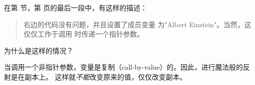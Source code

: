 \begin{Exercise}[title={指针和反射},difficulty=5]
\label{ex:pointers and reflection}
\Question
在第  节，第 \pageref{sec:introspection and reflection} 
页的最后一段中，有这样的描述：
\begin{quote}
右边的代码没有问题，并且设置了成员变量  
为"Albert Einstein"。当然，这仅仅工作于调用  时传递一个指针参数。
\end{quote}
为什么是这样的情况？
\end{Exercise}

\begin{Answer}
\Question
当调用一个非指针参数，变量是复制（call-by-value）的。因此，进行魔法般的反射是在副本上。
这样就\emph{不能}改变原来的值，仅仅改变副本。
\end{Answer}
